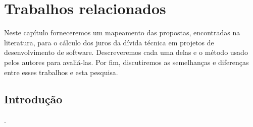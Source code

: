 \chapter{Trabalhos relacionados}
\label{relacionados}

Neste capítulo forneceremos um mapeamento das propostas, encontradas na literatura, para o cálculo dos juros da dívida técnica em projetos de desenvolvimento de software. Descreveremos cada uma delas e o método usado pelos autores para avaliá-las. Por fim, discutiremos as semelhanças e diferenças entre esses trabalhos e esta pesquisa. 


\section{Introdução}






.

